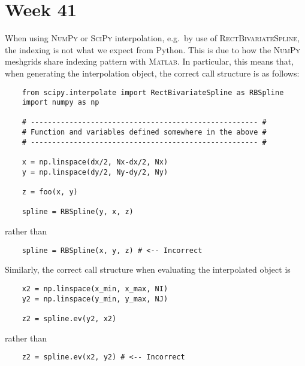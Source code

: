 \section{Week 41}

When using \textsc{NumPy} or \textsc{SciPy} interpolation, e.g.\ by use of
\textsc{RectBivariateSpline}, the indexing is not what we expect from Python. 
This is due to how the \textsc{NumPy} meshgrids share indexing pattern with 
\textsc{Matlab}. In particular, this means that, when generating the 
interpolation object, the correct call structure is as follows:

\begin{verbatim}
    from scipy.interpolate import RectBivariateSpline as RBSpline
    import numpy as np

    # ----------------------------------------------------- #
    # Function and variables defined somewhere in the above # 
    # ----------------------------------------------------- #

    x = np.linspace(dx/2, Nx-dx/2, Nx)
    y = np.linspace(dy/2, Ny-dy/2, Ny)

    z = foo(x, y)

    spline = RBSpline(y, x, z)
\end{verbatim}

rather than

\begin{verbatim}
    spline = RBSpline(x, y, z) # <-- Incorrect
\end{verbatim}

Similarly, the correct call structure when evaluating the interpolated object
is

\begin{verbatim}
    x2 = np.linspace(x_min, x_max, NI)
    y2 = np.linspace(y_min, y_max, NJ)

    z2 = spline.ev(y2, x2)
\end{verbatim}

rather than

\begin{verbatim}
    z2 = spline.ev(x2, y2) # <-- Incorrect
\end{verbatim}


